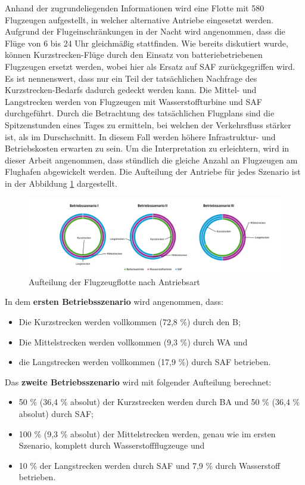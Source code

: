 Anhand der zugrundeliegenden Informationen wird eine Flotte mit 580 Flugzeugen aufgestellt, 
in welcher alternative Antriebe eingesetzt werden.
Aufgrund der Flugeinschränkungen in der Nacht wird angenommen, 
dass die Flüge von 6 bis 24 Uhr gleichmäßig stattfinden. 
Wie bereits diskutiert wurde, können Kurzstrecken-Flüge durch 
den Einsatz von batteriebetriebenen Flugzeugen ersetzt werden, 
wobei hier als Ersatz auf SAF zurückgegriffen wird. 
Es ist nennenswert, dass nur ein Teil der tatsächlichen Nachfrage des Kurzstrecken-Bedarfs 
dadurch gedeckt werden kann. 
Die Mittel- und Langstrecken werden von Flugzeugen mit Wasserstoffturbine und SAF durchgeführt.
%
Durch die Betrachtung des tatsächlichen Flugplans sind die Spitzenstunden eines Tages zu ermitteln, 
bei welchen der Verkehrsfluss stärker ist, als im Durschschnitt.
In diesem Fall werden höhere Infrastruktur- und Betriebskosten erwarten zu sein.
Um die Interpretation zu erleichtern, wird in dieser Arbeit angenommen, 
dass stündlich die gleiche Anzahl an Flugzeugen am Flughafen abgewickelt werden. 
%
Die Aufteilung der Antriebe für jedes Szenario ist in der Abbildung \ref{betriebsszenarien} dargestellt.\\
%
\begin{figure}[h]
	\centering
	\includegraphics[width=1.0\linewidth]{Bilder/Betriebsszenarien.png}
	\caption[Betriebsszenarien]{Aufteilung der Flugzeugflotte nach Antriebsart}
	\label{betriebsszenarien}
\end{figure}
%
In dem \textbf{ersten Betriebsszenario} wird angenommen, dass:
\begin{itemize}
    \item Die Kurzstrecken werden vollkommen (72,8 \%) durch den B;
    \item Die Mittelstrecken werden vollkommen (9,3 \%) durch WA und
    \item die Langstrecken werden vollkommen (17,9 \%) durch SAF betrieben.
\end{itemize}
Das \textbf{zweite Betriebsszenario} wird mit folgender Aufteilung berechnet:
\begin{itemize}
    \item 50 \% (36,4 \% absolut) der Kurzstrecken werden durch BA und 50 \% (36,4 \% absolut) durch SAF; 
    \item 100 \% (9,3 \% absolut) der Mittelstrecken werden, genau wie im ersten Szenario, komplett durch Wasserstoffflugzeuge und
    \item 10 \% der Langstrecken werden durch SAF und 7,9 \% durch Wasserstoff betrieben.
\end{itemize}
